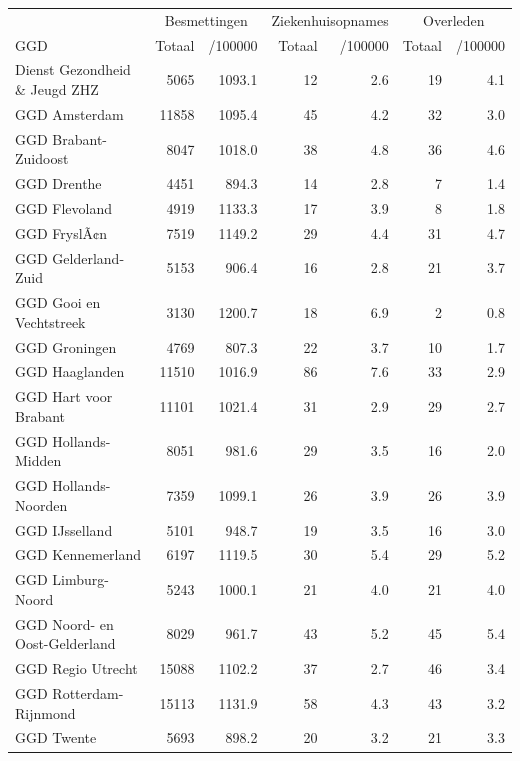 \documentclass[
  english,
  man,floatsintext]{apa6}
\begin{document}
\begin{table}
\centering\begingroup\fontsize{10}{12}\selectfont

\begin{threeparttable}
\begin{tabular}{lrrrrrr}
\toprule
\multicolumn{1}{c}{ } & \multicolumn{2}{c}{Besmettingen} & \multicolumn{2}{c}{Ziekenhuisopnames} & \multicolumn{2}{c}{Overleden} \\
\cmidrule(l{3pt}r{3pt}){2-3} \cmidrule(l{3pt}r{3pt}){4-5} \cmidrule(l{3pt}r{3pt}){6-7}
GGD & Totaal & /100000 & Totaal & /100000 & Totaal & /100000\\
\midrule
Dienst Gezondheid \& Jeugd ZHZ & 5065 & 1093.1 & 12 & 2.6 & 19 & 4.1\\
GGD Amsterdam & 11858 & 1095.4 & 45 & 4.2 & 32 & 3.0\\
GGD Brabant-Zuidoost & 8047 & 1018.0 & 38 & 4.8 & 36 & 4.6\\
GGD Drenthe & 4451 & 894.3 & 14 & 2.8 & 7 & 1.4\\
GGD Flevoland & 4919 & 1133.3 & 17 & 3.9 & 8 & 1.8\\
GGD FryslÃ¢n & 7519 & 1149.2 & 29 & 4.4 & 31 & 4.7\\
GGD Gelderland-Zuid & 5153 & 906.4 & 16 & 2.8 & 21 & 3.7\\
GGD Gooi en Vechtstreek & 3130 & 1200.7 & 18 & 6.9 & 2 & 0.8\\
GGD Groningen & 4769 & 807.3 & 22 & 3.7 & 10 & 1.7\\
GGD Haaglanden & 11510 & 1016.9 & 86 & 7.6 & 33 & 2.9\\
GGD Hart voor Brabant & 11101 & 1021.4 & 31 & 2.9 & 29 & 2.7\\
GGD Hollands-Midden & 8051 & 981.6 & 29 & 3.5 & 16 & 2.0\\
GGD Hollands-Noorden & 7359 & 1099.1 & 26 & 3.9 & 26 & 3.9\\
GGD IJsselland & 5101 & 948.7 & 19 & 3.5 & 16 & 3.0\\
GGD Kennemerland & 6197 & 1119.5 & 30 & 5.4 & 29 & 5.2\\
GGD Limburg-Noord & 5243 & 1000.1 & 21 & 4.0 & 21 & 4.0\\
GGD Noord- en Oost-Gelderland & 8029 & 961.7 & 43 & 5.2 & 45 & 5.4\\
GGD Regio Utrecht & 15088 & 1102.2 & 37 & 2.7 & 46 & 3.4\\
GGD Rotterdam-Rijnmond & 15113 & 1131.9 & 58 & 4.3 & 43 & 3.2\\
GGD Twente & 5693 & 898.2 & 20 & 3.2 & 21 & 3.3\\

\end{tabular}
\end{threeparttable}
\end{table}
\end{document}
